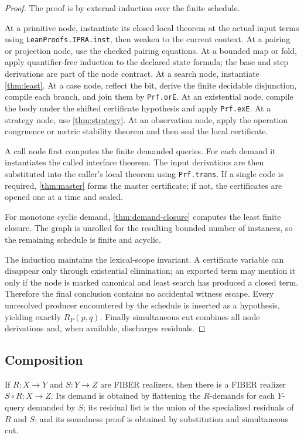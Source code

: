 \begin{proof}
The proof is by external induction over the finite schedule.

At a primitive node, instantiate its closed local theorem at the actual input
terms using \texttt{LeanProofs.IPRA.inst}, then weaken to the current context.
At a pairing or projection node, use the checked pairing equations.  At a
bounded map or fold, apply quantifier-free induction to the declared state
formula; the base and step derivations are part of the node contract.  At a
search node, instantiate \cref{thm:least}.  At a case node, reflect the bit,
derive the finite decidable disjunction, compile each branch, and join them by
\texttt{Prf.orE}.  At an existential node, compile the body under the shifted
certificate hypothesis and apply \texttt{Prf.exE}.  At a strategy node, use
\cref{thm:strategy}.  At an observation node, apply the operation congruence
or metric stability theorem and then seal the local certificate.

A call node first computes the finite demanded queries.  For each demand it
instantiates the called interface theorem.  The input derivations are then
substituted into the caller's local theorem using \texttt{Prf.trans}.  If a
single code is required, \cref{thm:master} forms the master certificate; if
not, the certificates are opened one at a time and sealed.

For monotone cyclic demand, \cref{thm:demand-closure} computes the least finite
closure.  The graph is unrolled for the resulting bounded number of instances,
so the remaining schedule is finite and acyclic.

The induction maintains the lexical-scope invariant.  A certificate variable
can disappear only through existential elimination; an exported term may
mention it only if the node is marked canonical and least search has produced
a closed term.  Therefore the final conclusion contains no accidental witness
escape.  Every unresolved producer encountered by the schedule is inserted as
a hypothesis, yielding exactly \(R_P(p,q)\).  Finally simultaneous cut
combines all node derivations and, when available, discharges residuals.
\end{proof}

\subsection{Composition}

\begin{theorem}[Compositionality]
\label{thm:composition}
If \(R:X\to Y\) and \(S:Y\to Z\) are FIBER realizers, then there is a FIBER
realizer \(S\circ R:X\to Z\).  Its demand is obtained by flattening the
\(R\)-demands for each \(Y\)-query demanded by \(S\); its residual list is the
union of the specialized residuals of \(R\) and \(S\); and its soundness proof
is obtained by substitution and simultaneous cut.
\end{theorem}

